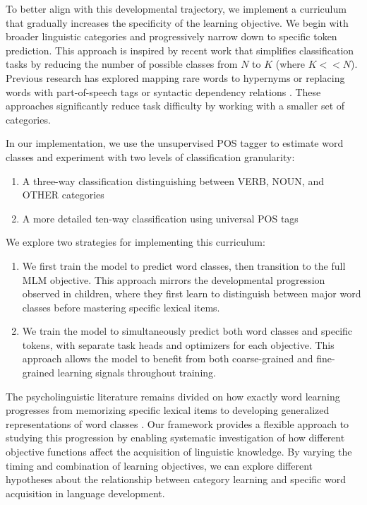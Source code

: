 To better align with this developmental trajectory, we implement a curriculum that gradually increases the specificity of the learning objective. We begin with broader linguistic categories and progressively narrow down to specific token prediction. This approach is inspired by recent work that simplifies classification tasks by reducing the number of possible classes from $N$ to $K$ (where $K << N$). Previous research has explored mapping rare words to hypernyms \cite{bai2022better} or replacing words with part-of-speech tags \cite{wang2023language} or syntactic dependency relations \cite{cui2022lert}. These approaches significantly reduce task difficulty by working with a smaller set of categories.

In our implementation, we use the unsupervised POS tagger to estimate word classes and experiment with two levels of classification granularity:
\begin{enumerate}
    \item A three-way classification distinguishing between VERB, NOUN, and OTHER categories
    \item A more detailed ten-way classification using universal POS tags
\end{enumerate}

We explore two strategies for implementing this curriculum:

\begin{enumerate}
    \item {} We first train the model to predict word classes, then transition to the full MLM objective. This approach mirrors the developmental progression observed in children, where they first learn to distinguish between major word classes before mastering specific lexical items.
    
    \item {} We train the model to simultaneously predict both word classes and specific tokens, with separate task heads and optimizers for each objective. This approach allows the model to benefit from both coarse-grained and fine-grained learning signals throughout training.
\end{enumerate}

The psycholinguistic literature remains divided on how exactly word learning progresses from memorizing specific lexical items to developing generalized representations of word classes \cite{clark2015first}. Our framework provides a flexible approach to studying this progression by enabling systematic investigation of how different objective functions affect the acquisition of linguistic knowledge. By varying the timing and combination of learning objectives, we can explore different hypotheses about the relationship between category learning and specific word acquisition in language development.

